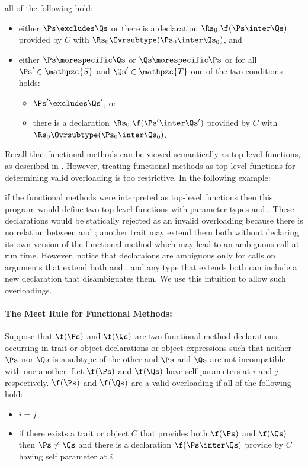 all of the following hold:
\begin{itemize}
\item
either $\Ps \excludes \Qs$ or there is a declaration $\Rs_0.\f(\Ps
\inter \Qs)$ provided by $C$ with $\Rs_0 \Ovrsubtype (\Ps_0 \inter
\Qs_0)$, and
\item
either $\Ps \morespecific \Qs$ or $\Qs \morespecific \Ps$ or
for all $\Ps' \in \mathpzc{S}$ and
$\Qs' \in \mathpzc{T}$ one of the two conditions holds:
\begin{itemize}
\item
$\Ps' \excludes \Qs'$, or
\item
there is a declaration $\Rs_0.\f(\Ps' \inter \Qs')$ provided by $C$
with $\Rs_0 \Ovrsubtype (\Ps_0 \inter \Qs_0)$.
\end{itemize}
\end{itemize}

Recall that functional methods can be viewed semantically as top-level
functions, as described in .  However, treating
functional methods as top-level functions for determining valid
overloading is too restrictive.  In the following example:

if the functional methods were interpreted as top-level functions then
this program would define two top-level functions with parameter types
 and .
These declarations would be
statically rejected as
an invalid overloading because there is no
relation between  and ; another trait
may extend them both without declaring its own version of the
functional method which may lead to an ambiguous call at run time.
However, notice that declaraions are ambiguous only for calls on
arguments that extend both  and , and
any type that extends both can include a new declaration that
disambiguates them.  We use this intuition to allow such overloadings.

\paragraph{The Meet Rule for Functional Methods:}
Suppose that $\f(\Ps)$ and $\f(\Qs)$ are two functional method
declarations occurring in trait or object declarations or object expressions
such that neither $\Ps$ nor $\Qs$ is a subtype of the other and $\Ps$ and $\Qs$
are not incompatible with one another.  Let $\f(\Ps)$ and $\f(\Qs)$
have self parameters at $i$ and $j$ respectively.
$\f(\Ps)$ and $\f(\Qs)$ are a valid
overloading if all of the following hold:
\begin{itemize}
\item
$i = j$
\item if there exists a trait or object $C$
that provides both $\f(\Ps)$ and $\f(\Qs)$ then $\Ps \neq \Qs$ and
there is a declaration $\f(\Ps \inter \Qs)$ provide by $C$
having self parameter at $i$.
\end{itemize}

